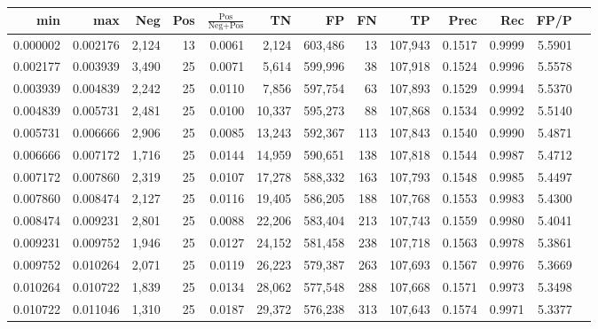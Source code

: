 \begin{tabular}{rrrrrrrrrrrrr}
\toprule
     min &      max &   Neg & Pos & $\frac{\text{Pos}}{\text{Neg}+\text{Pos}}$ &      TN &      FP &      FN &      TP &   Prec &    Rec &   FP/P \\
\midrule
0.000002 & 0.002176 & 2,124 &  13 &                                     0.0061 &   2,124 & 603,486 &      13 & 107,943 & 0.1517 & 0.9999 & 5.5901 \\
0.002177 & 0.003939 & 3,490 &  25 &                                     0.0071 &   5,614 & 599,996 &      38 & 107,918 & 0.1524 & 0.9996 & 5.5578 \\
0.003939 & 0.004839 & 2,242 &  25 &                                     0.0110 &   7,856 & 597,754 &      63 & 107,893 & 0.1529 & 0.9994 & 5.5370 \\
0.004839 & 0.005731 & 2,481 &  25 &                                     0.0100 &  10,337 & 595,273 &      88 & 107,868 & 0.1534 & 0.9992 & 5.5140 \\
0.005731 & 0.006666 & 2,906 &  25 &                                     0.0085 &  13,243 & 592,367 &     113 & 107,843 & 0.1540 & 0.9990 & 5.4871 \\
0.006666 & 0.007172 & 1,716 &  25 &                                     0.0144 &  14,959 & 590,651 &     138 & 107,818 & 0.1544 & 0.9987 & 5.4712 \\
0.007172 & 0.007860 & 2,319 &  25 &                                     0.0107 &  17,278 & 588,332 &     163 & 107,793 & 0.1548 & 0.9985 & 5.4497 \\
0.007860 & 0.008474 & 2,127 &  25 &                                     0.0116 &  19,405 & 586,205 &     188 & 107,768 & 0.1553 & 0.9983 & 5.4300 \\
0.008474 & 0.009231 & 2,801 &  25 &                                     0.0088 &  22,206 & 583,404 &     213 & 107,743 & 0.1559 & 0.9980 & 5.4041 \\
0.009231 & 0.009752 & 1,946 &  25 &                                     0.0127 &  24,152 & 581,458 &     238 & 107,718 & 0.1563 & 0.9978 & 5.3861 \\
0.009752 & 0.010264 & 2,071 &  25 &                                     0.0119 &  26,223 & 579,387 &     263 & 107,693 & 0.1567 & 0.9976 & 5.3669 \\
0.010264 & 0.010722 & 1,839 &  25 &                                     0.0134 &  28,062 & 577,548 &     288 & 107,668 & 0.1571 & 0.9973 & 5.3498 \\
0.010722 & 0.011046 & 1,310 &  25 &                                     0.0187 &  29,372 & 576,238 &     313 & 107,643 & 0.1574 & 0.9971 & 5.3377 \\

\end{tabular}
